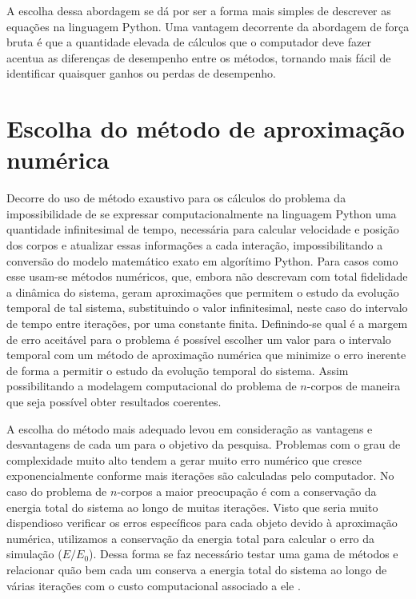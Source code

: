\documentclass[
	12pt,				%
	a4paper,			%
	english,			%
	openright,				%
	brazil,				%
	oneside]{abntex2}
\begin{document}
	A escolha dessa abordagem se dá por ser a forma mais simples de descrever as equações na linguagem Python. Uma vantagem decorrente da abordagem de força bruta é que a quantidade elevada de cálculos que o computador deve fazer acentua as diferenças de desempenho entre os métodos, tornando mais fácil de identificar quaisquer ganhos ou perdas de desempenho.
	
	
\section{Escolha do método de aproximação numérica}

	Decorre do uso de método exaustivo para os cálculos do problema da impossibilidade de se expressar computacionalmente na linguagem Python uma quantidade infinitesimal de tempo, necessária para calcular velocidade e posição dos corpos e atualizar essas informações a cada interação, impossibilitando a conversão do modelo matemático exato em algorítimo Python. Para casos como esse usam-se métodos numéricos, que, embora não descrevam com total fidelidade a dinâmica do sistema, geram aproximações que permitem o estudo da evolução temporal de tal sistema, substituindo o valor infinitesimal, neste caso do intervalo de tempo entre iterações, por uma constante finita. Definindo-se qual é a margem de erro aceitável para o problema é possível escolher um valor para o intervalo temporal com um método de aproximação numérica que minimize o erro inerente de forma a permitir o estudo da evolução temporal do sistema. Assim possibilitando a modelagem computacional do problema de $n$-corpos de maneira que seja possível obter resultados coerentes.
	
	A escolha do método mais adequado levou em consideração as vantagens e desvantagens de cada um para o objetivo da pesquisa. Problemas com o grau de complexidade muito alto tendem a gerar muito erro numérico que cresce exponencialmente conforme mais iterações são calculadas pelo computador.  No caso do problema de $n$-corpos a maior preocupação é com a conservação da energia total do sistema ao longo de muitas iterações. Visto que seria muito dispendioso verificar os erros específicos para cada objeto devido à aproximação numérica, utilizamos a conservação da energia total para calcular o erro da simulação ($E/E_0$). Dessa forma se faz necessário testar uma gama de métodos e relacionar quão bem cada um conserva a energia total do sistema ao longo de várias iterações com o custo computacional associado a ele \cite{daniel2012numerical}.
	
\end{document}
